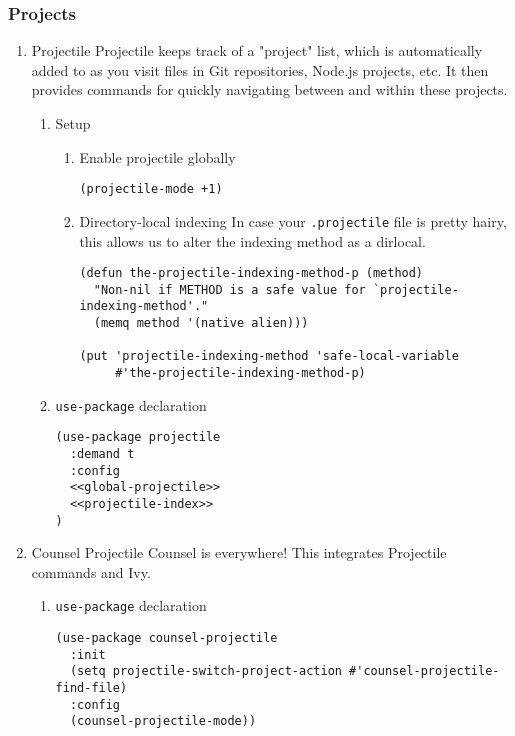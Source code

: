 \documentclass[11pt]{article}
\begin{document}
\subsubsection{Projects}
\label{sec:org4ecd8f5}
\begin{enumerate}
\item Projectile
\label{sec:orgca71a97}
Projectile keeps track of a "project" list, which is automatically
added to as you visit files in Git repositories, Node.js projects,
etc. It then provides commands for quickly navigating between and
within these projects.

\begin{enumerate}
\item Setup
\label{sec:org5e0fbd1}
\begin{enumerate}
\item Enable projectile globally
\label{sec:org93928a6}
\begin{verbatim}
(projectile-mode +1)
\end{verbatim}
\item Directory-local indexing
\label{sec:org3857d1f}
In case your \texttt{.projectile} file is pretty hairy, this allows us to
alter the indexing method as a dirlocal.
\begin{verbatim}
(defun the-projectile-indexing-method-p (method)
  "Non-nil if METHOD is a safe value for `projectile-indexing-method'."
  (memq method '(native alien)))

(put 'projectile-indexing-method 'safe-local-variable
     #'the-projectile-indexing-method-p)
\end{verbatim}
\end{enumerate}
\item \texttt{use-package} declaration
\label{sec:orgbeb5c95}
\begin{verbatim}
(use-package projectile
  :demand t
  :config
  <<global-projectile>>
  <<projectile-index>>
)
\end{verbatim}
\end{enumerate}
\item Counsel Projectile
\label{sec:org79b3d6c}
Counsel is everywhere! This integrates Projectile commands and Ivy.
\begin{enumerate}
\item \texttt{use-package} declaration
\label{sec:orgc68bc0b}
\begin{verbatim}
(use-package counsel-projectile
  :init
  (setq projectile-switch-project-action #'counsel-projectile-find-file)
  :config
  (counsel-projectile-mode))
\end{verbatim}
\end{enumerate}
\end{enumerate}
\end{document}
